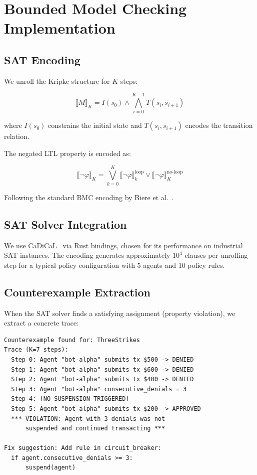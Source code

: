 \documentclass{llncs}
\begin{document}
\section{Bounded Model Checking Implementation}

\subsection{SAT Encoding}

We unroll the Kripke structure for $K$ steps:

$$\llbracket M \rrbracket_K = I(s_0) \wedge \bigwedge_{i=0}^{K-1} T(s_i, s_{i+1})$$

where $I(s_0)$ constrains the initial state and $T(s_i, s_{i+1})$ encodes the transition relation.

The negated LTL property is encoded as:

$$\llbracket \neg\varphi \rrbracket_K = \bigvee_{k=0}^{K} \llbracket \neg\varphi \rrbracket_k^{\text{loop}} \vee \llbracket \neg\varphi \rrbracket_K^{\text{no-loop}}$$

Following the standard BMC encoding by Biere et al.~\cite{biere2003}.

\subsection{SAT Solver Integration}

We use CaDiCaL~\cite{cadical} via Rust bindings, chosen for its performance on industrial SAT instances. The encoding generates approximately $10^4$ clauses per unrolling step for a typical policy configuration with 5 agents and 10 policy rules.

\subsection{Counterexample Extraction}

When the SAT solver finds a satisfying assignment (property violation), we extract a concrete trace:

\begin{lstlisting}[basicstyle=\ttfamily\small, frame=single]
Counterexample found for: ThreeStrikes
Trace (K=7 steps):
  Step 0: Agent "bot-alpha" submits tx $500 -> DENIED
  Step 1: Agent "bot-alpha" submits tx $600 -> DENIED
  Step 2: Agent "bot-alpha" submits tx $400 -> DENIED
  Step 3: Agent "bot-alpha" consecutive_denials = 3
  Step 4: [NO SUSPENSION TRIGGERED]
  Step 5: Agent "bot-alpha" submits tx $200 -> APPROVED
  *** VIOLATION: Agent with 3 denials was not
      suspended and continued transacting ***

Fix suggestion: Add rule in circuit_breaker:
  if agent.consecutive_denials >= 3:
      suspend(agent)
\end{lstlisting}
\end{document}
